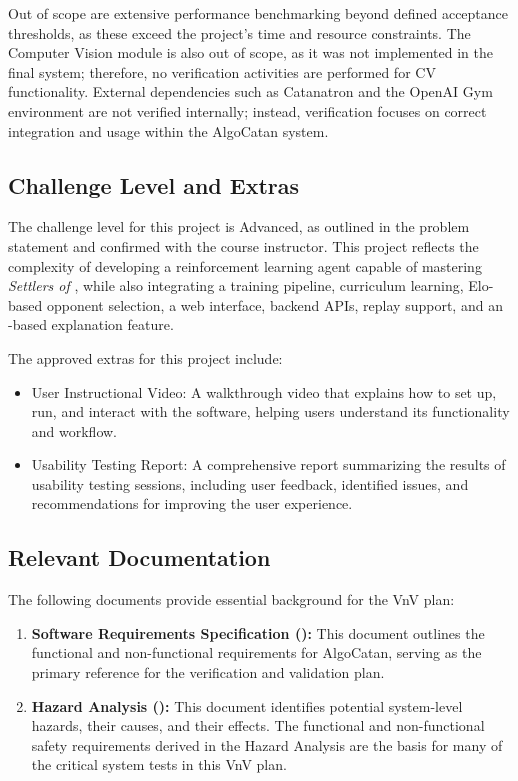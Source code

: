 \documentclass[12pt, titlepage]{article}
\begin{document}
  \medskip
  
  Out of scope are extensive performance
   benchmarking beyond defined acceptance thresholds, as these exceed the 
   project’s time and resource constraints. The Computer Vision module is also
    out of scope, as it was not implemented in the final system; therefore, no
     verification activities are performed for CV functionality. 
     External dependencies such as Catanatron and the OpenAI Gym environment
     are not verified internally; instead, verification focuses on 
     correct integration and usage within the AlgoCatan system.
  
  \subsection{Challenge Level and Extras}

The challenge level for this project is Advanced, as outlined in the problem
statement and confirmed with the course instructor. This project reflects the
complexity of developing a reinforcement learning agent capable of mastering
\textit{Settlers of \Catan{}}, while also integrating a training pipeline,
curriculum learning, Elo-based opponent selection, a web interface,
backend APIs, replay support, and an \LLM{}-based explanation feature.


\medskip
The approved extras for this project include:
\begin{itemize}
    \item User Instructional Video: A walkthrough video that explains how to set up, run, and interact with the software, helping users understand its functionality and workflow.
    \item Usability Testing Report: A comprehensive report summarizing the results of usability testing sessions, including user feedback, identified issues, and recommendations for improving the user experience.
\end{itemize}

\subsection{Relevant Documentation}

The following documents provide essential background for the VnV plan:

\begin{enumerate}
  \item \textbf{Software Requirements Specification (\citet{SRS}):} This document outlines the functional and non-functional requirements for AlgoCatan, serving as the primary reference for the verification and validation plan.
  \item \textbf{Hazard Analysis (\citet{HA}):} This document identifies potential system-level hazards, their causes, and their effects.
  The functional and non-functional safety requirements derived in the Hazard Analysis are the basis for many of the critical system tests in this VnV plan.
\end{enumerate}
\end{document}
